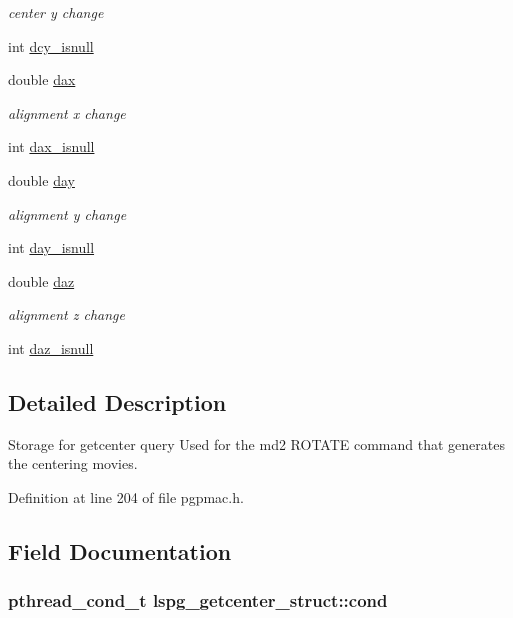 \begin{DoxyCompactItemize}
\begin{DoxyCompactList}\small\item\em center y change \end{DoxyCompactList}\item 
int \hyperlink{structlspg__getcenter__struct_a352c48c8d443c52f18ebd13019d01684}{dcy\-\_\-isnull}
\item 
double \hyperlink{structlspg__getcenter__struct_a17db52848c28852a470222ec93ae8886}{dax}
\begin{DoxyCompactList}\small\item\em alignment x change \end{DoxyCompactList}\item 
int \hyperlink{structlspg__getcenter__struct_a621b489777d61e9db8b33b784b8d70f9}{dax\-\_\-isnull}
\item 
double \hyperlink{structlspg__getcenter__struct_a9ce0f29540f2ff47be9788565d19f1b8}{day}
\begin{DoxyCompactList}\small\item\em alignment y change \end{DoxyCompactList}\item 
int \hyperlink{structlspg__getcenter__struct_a36f57a319288810caf365cca7827ff96}{day\-\_\-isnull}
\item 
double \hyperlink{structlspg__getcenter__struct_a1170bab2161f03ab29c39f79519ed9ae}{daz}
\begin{DoxyCompactList}\small\item\em alignment z change \end{DoxyCompactList}\item 
int \hyperlink{structlspg__getcenter__struct_a36742b6bd0f4bf9356414930ba893617}{daz\-\_\-isnull}
\end{DoxyCompactItemize}


\subsection{Detailed Description}
Storage for getcenter query Used for the md2 R\-O\-T\-A\-T\-E command that generates the centering movies. 

Definition at line 204 of file pgpmac.\-h.



\subsection{Field Documentation}
\hypertarget{structlspg__getcenter__struct_ae0db0ff2608ab5ba3e7c1b4ad3fc0e91}{
\subsubsection[{cond}]{\setlength{\rightskip}{0pt plus 5cm}pthread\-\_\-cond\-\_\-t lspg\-\_\-getcenter\-\_\-struct\-::cond}}\label{structlspg__getcenter__struct_ae0db0ff2608ab5ba3e7c1b4ad3fc0e91}


